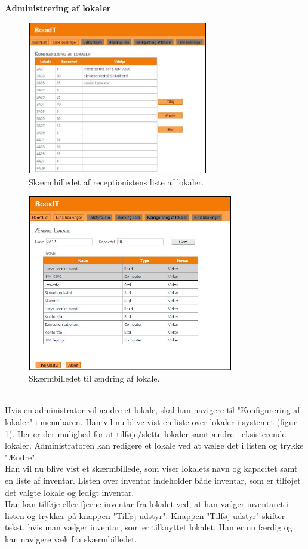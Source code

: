 \textbf{Administrering af lokaler}
\begin{figure}[h!]
  \centering
    \includegraphics[width=0.7\textwidth]{Appendix/GUI-Prototype/DigitalMockup/LokaleListe}
  \caption{Skærmbilledet af receptionistens liste af lokaler.}
\label{Design_G_Development_LokaleListe_Final}
\end{figure}
\begin{figure}[h!]
  \centering
    \includegraphics[width=0.8\textwidth]{Appendix/GUI-Prototype/DigitalMockup/AendreLokale}
  \caption{Skærmbilledet til ændring af lokale.}
\label{Design_G_Development_AendreLokale_Final}
\end{figure} 
\\Hvis en administrator vil ændre et lokale, skal han navigere til "Konfigurering af lokaler" i menubaren. Han vil nu blive vist en liste over lokaler i systemet (figur \ref{Design_G_Development_LokaleListe_Final}). Her er der mulighed for at tilføje/slette lokaler samt ændre i eksisterende lokaler. Administratoren kan redigere et lokale ved at vælge det i listen og trykke "Ændre". 
\\Han vil nu blive vist et skærmbillede, som viser lokalets navn og kapacitet samt en liste af inventar. Listen over inventar indeholder både inventar, som er tilføjet det valgte lokale og ledigt inventar.
\\Han kan tilføje eller fjerne inventar fra lokalet ved, at han vælger inventaret i listen og trykker på knappen "Tilføj udstyr". Knappen "Tilføj udstyr" skifter tekst, hvis man vælger inventar, som er tilknyttet lokalet. Han er nu færdig og kan navigere væk fra skærmbilledet.


